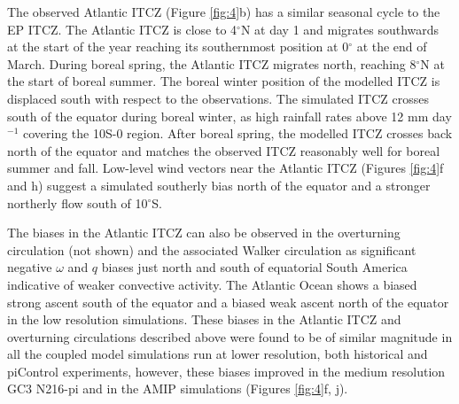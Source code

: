 The observed Atlantic ITCZ (Figure \ref{fig:4}b) has a similar seasonal cycle to the EP ITCZ.
The Atlantic ITCZ is close to 4$^\circ$N at day 1 and migrates southwards at the start of the year reaching  its southernmost position at 0$^\circ$ at the end of March.
During boreal spring, the Atlantic ITCZ migrates north, reaching 8$^\circ$N at the start of boreal summer.
The boreal winter position of the modelled ITCZ is displaced south with respect to the observations.
The simulated ITCZ  crosses south of the equator during boreal winter, as high rainfall rates above 12 mm day$^{-1}$ covering the 10S-0 region.
After boreal spring, the modelled ITCZ crosses back north of the equator and matches the observed ITCZ reasonably well for boreal summer and fall.
Low-level wind vectors near the Atlantic ITCZ (Figures \ref{fig:4}f and h) suggest a simulated southerly bias north of the equator and a stronger northerly flow south of 10$^\circ$S.




The biases in the Atlantic ITCZ can also be observed in the overturning circulation (not shown) and the associated Walker circulation as significant negative $\omega$ and $q$ biases just north and south of equatorial South America indicative of weaker convective activity. The Atlantic Ocean shows a biased strong ascent south of the equator and a biased weak ascent north of the equator in the low resolution simulations.
These biases in the Atlantic ITCZ and overturning circulations described above were found to be of similar magnitude in all the coupled model simulations run at lower resolution, both historical and piControl experiments,   however, these biases improved in the medium resolution GC3 N216-pi and in the AMIP simulations (Figures \ref{fig:4}f, j). 

